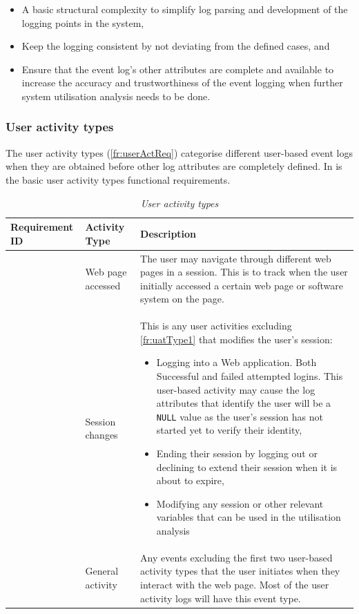 \begin{itemize}
	\item A basic structural complexity to simplify log parsing and development of the logging points in the system,
	\item Keep the logging consistent by not deviating from the defined cases, and
	\item Ensure that the event log's other attributes are complete and available to increase the accuracy and trustworthiness of the event logging when further system utilisation analysis needs to be done. 
\end{itemize}

\subsubsection{User activity types}\label{sec:ch2_userActivityTypes}
The user activity types (\ref{fr:userActReq}) categorise different user-based event logs when they are obtained before other log attributes are completely defined. In  is the basic user activity types functional requirements.

\clearpage

\begin{table}[!htb]
	\centering
	\caption[User activity types]
	{\textit{User activity types}}
	\label{tbl:ch2_userActivityTypes}
	\begin{tabularx}{\textwidth}{|l|l|X|}
		\hline \textbf{Requirement ID} & \textbf{Activity Type} & \textbf{Description} \\
		\hline \subsubphase{fr:uatType1} & Web page accessed & The user may navigate through different web pages in a session. This is to track when the user initially accessed a certain web page or software system on the page.\\
		\hline \subsubphase{fr:uatType2} & Session changes & This is any user activities excluding \ref{fr:uatType1} that modifies the user's session:
		\begin{itemize}
			\item Logging into a Web application. Both Successful and failed attempted logins. This user-based activity may cause the log attributes that identify the user will be a \texttt{NULL} value as the user's session has not started yet to verify their identity,
			\item Ending their session by logging out or declining to extend their session when it is about to expire,
			\item Modifying any session or other relevant variables that can be used in the utilisation analysis
		\end{itemize}\\
		\hline \subsubphase{fr:uatType3} & General activity & Any events excluding the first two user-based activity types that the user initiates when they interact with the web page. Most of the user activity logs will
		have this event type.\\ 
		\hline
	\end{tabularx}
\end{table}

